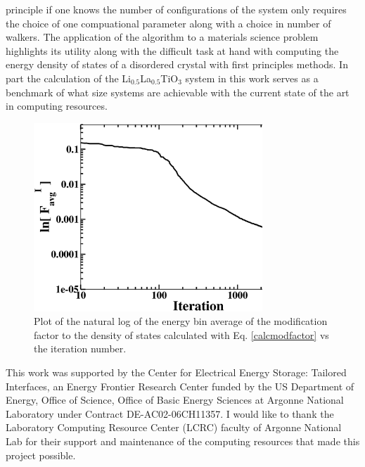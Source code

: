 \documentclass[aps,pre,reprint,superscriptaddress,showkeys]{revtex4-2}
\begin{document}
principle if one knows the number of configurations of the system only requires the choice of one compuational parameter along with a choice in number of walkers. The application of the algorithm to a materials science problem highlights its utility along with the difficult task at hand with computing the energy density of states of a disordered crystal with first principles methods. In part the calculation of the Li$_{0.5}$La$_{0.5}$TiO$_{3}$ system in this work serves as a benchmark of what size systems are achievable with the current state of the art in computing resources. 
 
 \begin{figure}[h!]
\includegraphics[width=8.6cm]{fig12.eps}
\caption{Plot of the natural log of the energy bin average of the modification factor to the density of states calculated with Eq. \ref{calcmodfactor} vs the iteration number.  \label{modfactor_LLTO}}
\end{figure}

\begin{acknowledgments}
This work was supported by the Center for Electrical Energy Storage: Tailored Interfaces, an Energy Frontier Research Center funded 
by the US Department of Energy, Office of Science, Office of Basic Energy Sciences at Argonne National Laboratory under Contract DE-AC02-06CH11357.
I would like to thank the Laboratory Computing Resource Center (LCRC) faculty of Argonne National Lab for their support and maintenance of the computing resources that made this project possible. 
\end{acknowledgments}



\end{document}
